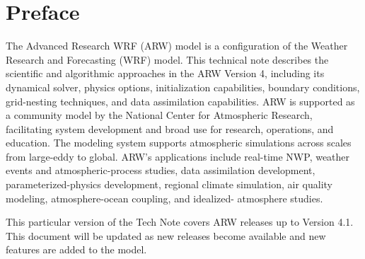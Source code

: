 \chapter*{Preface}

\hskip 20pt 
\noindent

The Advanced Research WRF (ARW) model is a configuration of the Weather Research and Forecasting (WRF) model.  
This technical note describes the scientific and algorithmic approaches in the ARW Version 4, including 
its dynamical solver, physics options, initialization capabilities, boundary conditions, grid-nesting 
techniques, and data assimilation capabilities.  ARW is supported as a community model by the National 
Center for Atmospheric Research, facilitating system development and broad use for research, operations, 
and education. The modeling system supports atmospheric simulations across scales from large-eddy to 
global. ARW’s applications include real-time NWP, weather events and atmospheric-process studies, 
data assimilation development, parameterized-physics development, regional climate simulation, 
air quality modeling, atmosphere-ocean coupling, and idealized- atmosphere studies.

\vskip 10pt
This particular version of the Tech Note covers ARW releases up to Version 4.1.
This document will be updated as new releases become available and new features are added to the model.

